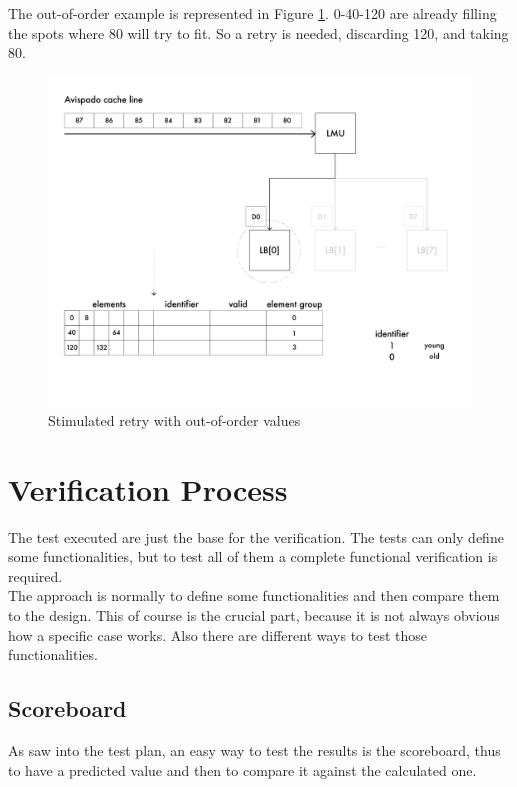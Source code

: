 The out-of-order example is represented in Figure \ref{cache-to-lb-ooo-ret-ex}. 0-40-120 are already filling the spots where 80 will try to fit. So a retry is needed, discarding 120, and taking 80.

\begin{figure}[H]
    \centering
    \includegraphics[scale = 0.5]{Chapter_2/img/cache-to-lb-ooo-ret-ex.png}
    \caption{Stimulated retry with out-of-order values}
    \label{cache-to-lb-ooo-ret-ex}
\end{figure}



\section{Verification Process}
The test executed are just the base for the verification. The tests can only define some functionalities, but to test all of them a complete functional verification is required.\\


The approach is normally to define some functionalities and then compare them to the design. This of course is the crucial part, because it is not always obvious how a specific case works. Also there are different ways to test those functionalities.\\

\subsection{Scoreboard}
As saw into the test plan, an easy way to test the results is the scoreboard, thus to have a predicted value and then to compare it against the calculated one.\\

